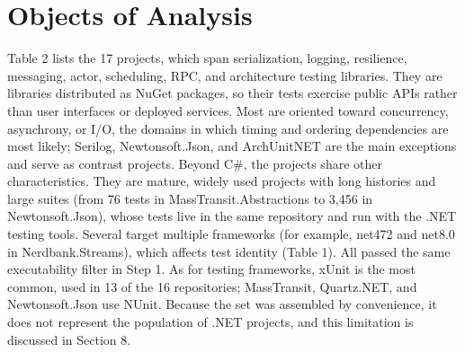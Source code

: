 \section{Objects of Analysis}
Table 2 lists the 17 projects, which span serialization, logging, resilience, messaging, actor, scheduling, RPC, and architecture testing libraries. They are libraries distributed as NuGet packages, so their tests exercise public APIs rather than user interfaces or deployed services. Most are oriented toward concurrency, asynchrony, or I/O, the domains in which timing and ordering dependencies are most likely; Serilog, Newtonsoft.Json, and ArchUnitNET are the main exceptions and serve as contrast projects. Beyond C\#, the projects share other characteristics. They are mature, widely used projects with long histories and large suites (from 76 tests in MassTransit.Abstractions to 3,456 in Newtonsoft.Json), whose tests live in the same repository and run with the .NET testing tools. Several target multiple frameworks (for example, net472 and net8.0 in Nerdbank.Streams), which affects test identity (Table 1). All passed the same executability filter in Step 1. As for testing frameworks, xUnit is the most common, used in 13 of the 16 repositories; MassTransit, Quartz.NET, and Newtonsoft.Json use NUnit. Because the set was assembled by convenience, it does not represent the population of .NET projects, and this limitation is discussed in Section 8.

